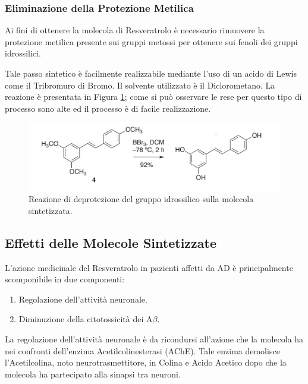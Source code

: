 \documentclass[a4paper, 12pt]{article}
\begin{document}
\subsubsection{Eliminazione della Protezione Metilica}
Ai fini di ottenere la molecola di Resveratrolo è necessario rimuovere la protezione metilica presente sui gruppi metossi per ottenere sui fenoli dei gruppi idrossilici.

Tale passo sintetico è facilmente realizzabile mediante l'uso di un acido di Lewis come il Tribromuro di Bromo. Il solvente utilizzato è il Diclorometano.
La reazione è presentata in Figura \ref{fig:deprot_resveratrolo}; come si può osservare le rese per questo tipo di processo sono alte ed il processo è di facile realizzazione. \cite{alejandro_v._martinez_expedient_2017}

\begin{figure}[H]
	\centering
	\includegraphics[width=\linewidth]{immagini/deprot_resveratrolo.png}
	\caption{Reazione di deprotezione del gruppo idrossilico sulla molecola sintetizzata.}
	\label{fig:deprot_resveratrolo}
\end{figure}

\subsection{Effetti delle Molecole Sintetizzate}
L'azione medicinale del Resveratrolo in pazienti affetti da AD è principalmente scomponibile in due componenti:

\begin{enumerate}
	\item Regolazione dell'attività neuronale.
	\item Diminuzione della citotossicità dei A$\beta$.
\end{enumerate}

La regolazione dell'attività neuronale è da ricondursi all'azione che la molecola ha nei confronti dell'enzima Acetilcolinesterasi (AChE). Tale enzima demolisce l'Acetilcolina, noto neurotrasmettitore, in Colina e Acido Acetico dopo che la molecola ha partecipato alla sinapsi tra neuroni.
\end{document}
